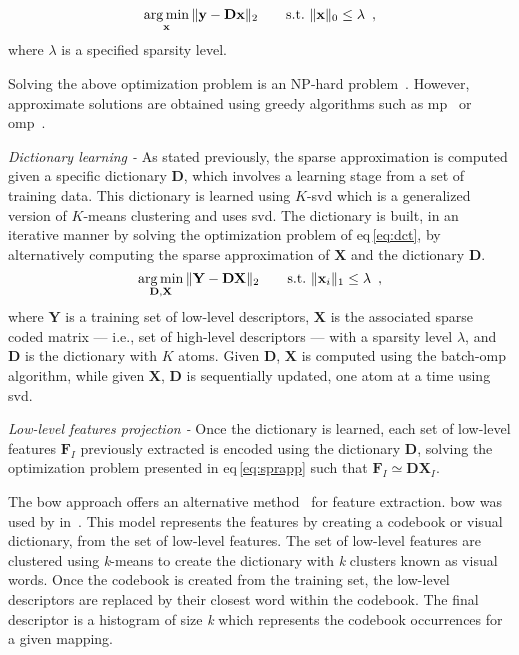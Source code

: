 \begin{equation}
  \operatorname*{arg\,min}_{\mathbf{x}}\|\mathbf{y - Dx} \|_{2} \qquad  \text{s.t.} \  \|\mathbf{x}\|_{0} \leq \lambda \, \label{eq:sprapp} \ ,
\end{equation}
\noindent where $\lambda$ is a specified sparsity level.

Solving the above optimization problem is an NP-hard problem~\cite{elad2010sparse}.
However, approximate solutions are obtained using greedy algorithms such as \ac{mp}~\cite{mallat1993matching} or \ac{omp}~\cite{pati1993orthogonal,davis1997adaptive}.

\emph{Dictionary learning -} As stated previously, the sparse approximation is computed given a specific dictionary $\mathbf{D}$, which involves a learning stage from a set of training data.
This dictionary is learned using $K$-\acs*{svd} which is a generalized version of $K$-means clustering and uses \ac{svd}. 
The dictionary is built, in an iterative manner by solving the optimization problem of \acs{eq}\,\eqref{eq:dct}, by alternatively computing the sparse approximation of $\mathbf{X}$ and the dictionary $\mathbf{D}$.
\begin{equation}
  \operatorname*{arg\,min}_{\mathbf{D,X}} \|\mathbf{Y} - \mathbf{D}\mathbf{X}\|_{2} \qquad  \text{s.t.} \  \|\mathbf{x}_{i}\|_{1} \leq \lambda \,\label{eq:dct} \ ,
\end{equation}
\noindent where $\mathbf{Y}$ is a training set of low-level descriptors, $\mathbf{X}$ is the associated sparse coded matrix --- i.e., set of high-level descriptors --- with a sparsity level $\lambda$, and $\mathbf{D}$ is the dictionary with $K$ atoms.
Given $\mathbf{D}$, $\mathbf{X}$ is computed using the batch-\ac{omp} algorithm, while given $\mathbf{X}$, $\mathbf{D}$ is sequentially updated, one atom at a time using \ac{svd}. 

\emph{Low-level features projection -} Once the dictionary is learned, each set of low-level features $\mathbf{F}_{I}$ previously extracted is encoded using the dictionary $\mathbf{D}$, solving the optimization problem presented in \acs{eq}\,\eqref{eq:sprapp} such that $\mathbf{F}_{I} \simeq \mathbf{DX}_{I}$.

The \ac{bow} approach offers an alternative method~\cite{Sivic2003} for feature extraction.
\Ac{bow} was used by \citeauthor{rampun2016computerb} in~\cite{rampun2015classifying,rampun2016computerb}.
This model represents the features by creating a codebook or visual dictionary, from the set of low-level features.
The set of low-level features are clustered using \textit{k}-means to create the dictionary with \textit{k} clusters known as visual words.
Once the codebook is created from the training set, the low-level descriptors are replaced by their closest word within the codebook.
The final descriptor is a histogram of size \textit{k} which represents the codebook occurrences for a given mapping.

